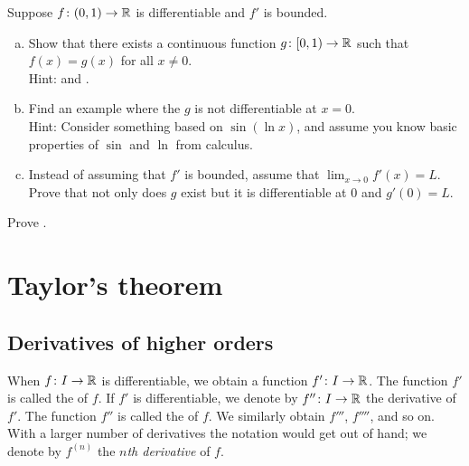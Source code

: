 \begin{exercise} \label{exercise:extendboundedder}
Suppose $f \colon (0,1) \to {\mathbb{R}}$ is differentiable and $f'$
is bounded.
\begin{enumerate}[a)]
\item
Show that there exists a continuous function $g \colon [0,1) \to {\mathbb{R}}$
such that $f(x) = g(x)$ for all $x \not= 0$.\\
Hint:  and
.
\item
Find an example where the $g$ is not differentiable at $x=0$.
\\
Hint: Consider something based on $\sin(\ln x)$,
and assume you know basic properties of
$\sin$ and $\ln$ from calculus.
\item
Instead of assuming that $f'$ is bounded, assume that $\lim_{x \to 0} f'(x)
= L$.  Prove that not only does $g$ exist but it is differentiable at $0$
and $g'(0) = L$.
\end{enumerate}
\end{exercise}

\begin{exercise}
Prove .
\end{exercise}


\sectionnewpage
\section{Taylor's theorem}
\label{sec:taylor}



\subsection{Derivatives of higher orders}

When $f \colon I \to {\mathbb{R}}$ is differentiable, we obtain a function
$f' \colon I \to {\mathbb{R}}$.  The function
$f'$ is called the \emph{} of $f$.
If $f'$ is differentiable, we denote by
$f'' \colon I \to {\mathbb{R}}$ the derivative of $f'$.  The function $f''$
is called the \emph{} of $f$.
We similarly obtain
$f'''$, $f''''$, and so on.
With a larger number of derivatives
the notation would get out of hand; we denote
by $f^{(n)}$ the
\emph{$n$th derivative} of $f$.


